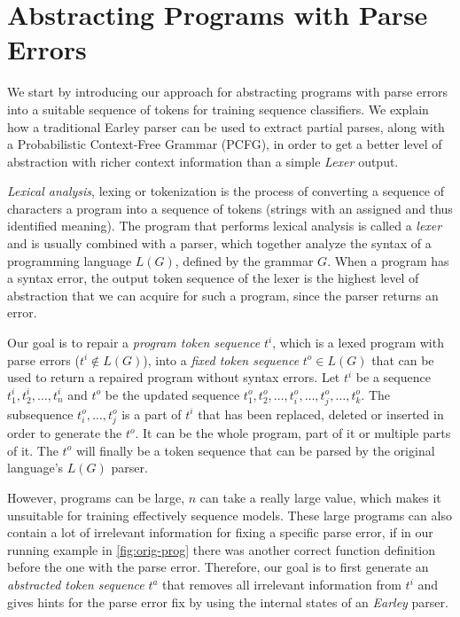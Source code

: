 \section{Abstracting Programs with Parse Errors}
\label{sec:prog-abstract}

We start by introducing our approach for abstracting programs with parse errors
into a suitable sequence of tokens for training sequence classifiers. We explain
how a traditional Earley parser can be used to extract partial parses, along
with a Probabilistic Context-Free Grammar (PCFG), in order to get a better level
of abstraction with richer context information than a simple \emph{Lexer}
output.



\emph{Lexical analysis}, lexing or tokenization is the process of converting a
sequence of characters \ie a program into a sequence of tokens (strings with an
assigned and thus identified meaning). The program that performs lexical
analysis is called a \emph{lexer} and is usually combined with a parser, which
together analyze the syntax of a programming language $L(G)$, defined by the
grammar $G$. When a program has a syntax error, the output token sequence of the
lexer is the highest level of abstraction that we can acquire for such a
program, since the parser returns an error.

Our goal is to repair a \emph{program token sequence} $t^i$, which is a lexed
program with parse errors (\ie $t^i \notin L(G)$), into a \emph{fixed token
sequence} $t^o \in L(G)$ that can be used to return a repaired program without
syntax errors. Let $t^i$ be a sequence $t^i_1, t^i_2, \dots, t^i_n$ and $t^o$ be
the updated sequence $t^o_1, t^o_2, \dots, t^o_i, \dots, t^o_j, \dots, t^o_k$.
The subsequence $t^o_i, \dots, t^o_j$ is a part of $t^i$ that has been replaced,
deleted or inserted in order to generate the $t^o$. It can be the whole program,
part of it or multiple parts of it. The $t^o$ will finally be a token sequence
that can be parsed by the original language's $L(G)$ parser.

However, programs can be large, \ie $n$ can take a really large value, which
makes it unsuitable for training effectively sequence models. These large
programs can also contain a lot of irrelevant information for fixing a specific
parse error, \eg if in our running example in \autoref{fig:orig-prog} there was
another correct function definition before the one with the parse error.
Therefore, our goal is to first generate an \emph{abstracted token sequence}
$t^a$ that removes all irrelevant information from $t^i$ and gives hints for the
parse error fix by using the internal states of an \emph{Earley} parser.


